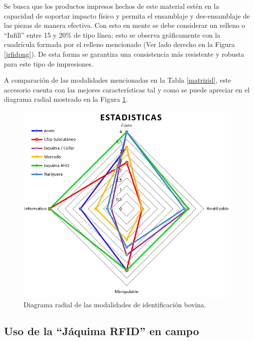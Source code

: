 Se busca que los productos impresos hechos de este material estén en la capacidad de soportar impacto físico y permita el ensamblaje y des-ensamblaje de las piezas de manera efectiva. Con esto en mente se debe considerar un relleno o ``Infill'' entre 15 y 20\% de tipo línea; esto se observa gráficamente con la cuadrícula formada por el relleno mencionado (Ver lado derecho en la Figura \ref{jrfidpng}). De esta forma se garantiza una consistencia más resistente y robusta para este tipo de impresiones.

A comparación de las modalidades mencionadas en la Tabla \ref{matrizid}, este accesorio cuenta con las mejores características tal y como se puede apreciar en el diagrama radial mostrado en la Figura \ref{statsidpng}.

\begin{figure}[H]
	\begin{center}
		\includegraphics[scale=0.55]{img/statsid2.png}
	\end{center}
	\caption{Diagrama radial de las modalidades de identificación bovina. \label{statsidpng}}
\end{figure}

\subsection{Uso de la ``Jáquima RFID'' en campo}


